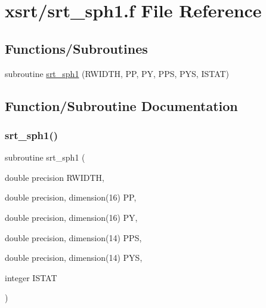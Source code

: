 \hypertarget{srt__sph1_8f}{}\section{xsrt/srt\+\_\+sph1.f File Reference}
\label{srt__sph1_8f}
\subsection*{Functions/\+Subroutines}
\begin{DoxyCompactItemize}
\item 
subroutine \hyperlink{srt__sph1_8f_af64478f55e1c7f9f2088b129b629c715}{srt\+\_\+sph1} (R\+W\+I\+D\+TH, PP, PY, P\+PS, P\+YS, I\+S\+T\+AT)
\end{DoxyCompactItemize}


\subsection{Function/\+Subroutine Documentation}
\mbox{\label{srt__sph1_8f_af64478f55e1c7f9f2088b129b629c715}} 
\subsubsection{\texorpdfstring{srt\+\_\+sph1()}{srt\_sph1()}}
{\footnotesize\ttfamily subroutine srt\+\_\+sph1 (\begin{DoxyParamCaption}\item[{double precision}]{R\+W\+I\+D\+TH,  }\item[{double precision, dimension(16)}]{PP,  }\item[{double precision, dimension(16)}]{PY,  }\item[{double precision, dimension(14)}]{P\+PS,  }\item[{double precision, dimension(14)}]{P\+YS,  }\item[{integer}]{I\+S\+T\+AT }\end{DoxyParamCaption})}

